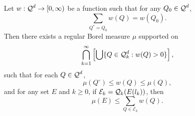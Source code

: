 \begin{theorem} \label{massdistributionprinciplelem}
	Let $w: \operatorname{\mathcal{Q}}^d \to [0,\infty)$ be a function such that for any $Q_0 \in \operatorname{\mathcal{Q}}^d$,
	\begin{equation} \label{equation73234091} \sum_{Q^* = Q_0} w(Q) = w(Q_0). \end{equation}
	Then there exists a regular Borel measure $\mu$ supported on
	\[ \bigcap_{k = 1}^\infty \left[ \bigcup \{ Q \in \operatorname{\mathcal{Q}}_k^d : w(Q) > 0 \} \right], \]
	such that for each $Q \in \operatorname{\mathcal{Q}}^d$,
	\begin{equation} \label{massdissupperbound} \mu(Q^\circ) \leq w(Q) \leq \mu(Q), \end{equation}
	and for any set $E$ and $k \geq 0$, if $\mathcal{E}_k = \operatorname{\mathcal{Q}}_k(E(l_k))$, then
	\begin{equation} \label{massdisslowerbound} \mu(E) \leq \sum_{Q \in \mathcal{E}_k} w(Q). \end{equation}
\end{theorem}
